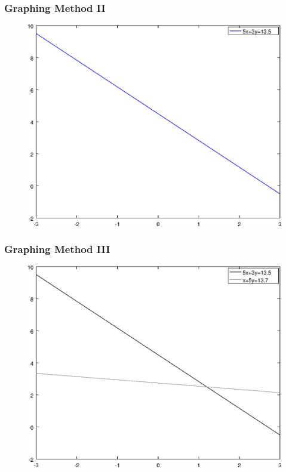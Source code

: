 \documentclass[xcolor=dvipsnames]{beamer}
\begin{document}
\begin{frame}
  \frametitle{Graphing Method II}
  \begin{figure}[h]
    \includegraphics[scale=.6]{./diagrams/gm-03-SystemsEquations-01.eps}
  \end{figure}
\end{frame}

\begin{frame}
  \frametitle{Graphing Method III}
  \begin{figure}[h]
    \includegraphics[scale=.6]{./diagrams/gm-03-SystemsEquations-02.eps}
  \end{figure}
\end{frame}
\end{document}
